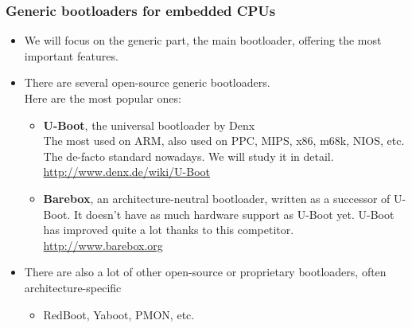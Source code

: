 \begin{frame}
  \frametitle{Generic bootloaders for embedded CPUs}
  \begin{itemize}
  \item We will focus on the generic part, the main bootloader, offering
    the most important features.
  \item There are several open-source generic bootloaders.\\
    Here are the most popular ones:
    \begin{itemize}
    \item {\bf U-Boot}, the universal bootloader by Denx\\
      The most used on ARM, also used on PPC, MIPS, x86, m68k, NIOS,
      etc. The de-facto standard nowadays. We will study it in detail.\\
      \url{http://www.denx.de/wiki/U-Boot}
    \item {\bf Barebox}, an architecture-neutral bootloader, written
      as a successor of U-Boot. It doesn't have as much hardware support
      as U-Boot yet. U-Boot has improved quite a lot thanks to this
      competitor.\\
      \url{http://www.barebox.org}
    \end{itemize}
  \item There are also a lot of other open-source or proprietary
    bootloaders, often architecture-specific
    \begin{itemize}
    \item RedBoot, Yaboot, PMON, etc.
    \end{itemize}
  \end{itemize}
\end{frame}
